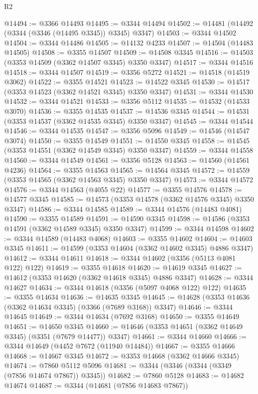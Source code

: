 \begin{lexlean}{R2}
\begin{coremodule}
@14494 := @3366 @14493
@14495 := @3344 @14494
@14502 := @14481 (@14492 (@3344 (@3346 (@14495 @3345)) @3345) @3347)
@14503 := @3344 @14502
@14504 := @3344 @14486
@14505 := @14132 @4233
@14507 := @14504 (@14483 @14505)
@14508 := @3355 @14507
@14509 := @14508 @3345
@14516 := @14503 (@3353 @14509 (@3362 @14507 @3345) @3350 @3347)
@14517 := @3344 @14516
@14518 := @3344 @14507
@14519 := @3356 @5272
@14521 := @14518 (@14519 @3062)
@14522 := @3355 @14521
@14523 := @14522 @3345
@14530 := @14517 (@3353 @14523 (@3362 @14521 @3345) @3350 @3347)
@14531 := @3344 @14530
@14532 := @3344 @14521
@14533 := @3356 @5112
@14535 := @14532 (@14533 @3070)
@14536 := @3355 @14535
@14537 := @14536 @3345
@14544 := @14531 (@3353 @14537 (@3362 @14535 @3345) @3350 @3347)
@14545 := @3344 @14544
@14546 := @3344 @14535
@14547 := @3356 @5096
@14549 := @14546 (@14547 @3074)
@14550 := @3355 @14549
@14551 := @14550 @3345
@14558 := @14545 (@3353 @14551 (@3362 @14549 @3345) @3350 @3347)
@14559 := @3344 @14558
@14560 := @3344 @14549
@14561 := @3356 @5128
@14563 := @14560 (@14561 @4236)
@14564 := @3355 @14563
@14565 := @14564 @3345
@14572 := @14559 (@3353 @14565 (@3362 @14563 @3345) @3350 @3347)
@14573 := @3344 @14572
@14576 := @3344 @14563 (@4055 @22)
@14577 := @3355 @14576
@14578 := @14577 @3345
@14585 := @14573 (@3353 @14578 (@3362 @14576 @3345) @3350 @3347)
@14586 := @3344 @14585
@14589 := @3344 @14576 (@14483 @4081)
@14590 := @3355 @14589
@14591 := @14590 @3345
@14598 := @14586 (@3353 @14591 (@3362 @14589 @3345) @3350 @3347)
@14599 := @3344 @14598
@14602 := @3344 @14589 (@14483 @4068)
@14603 := @3355 @14602
@14604 := @14603 @3345
@14611 := @14599 (@3353 @14604 (@3362 @14602 @3345) @4886 @3347)
@14612 := @3344 @14611
@14618 := @3344 @14602 (@3356 (@5113 @4081 @122) @122)
@14619 := @3355 @14618
@14620 := @14619 @3345
@14627 := @14612 (@3353 @14620 (@3362 @14618 @3345) @4886 @3347)
@14628 := @3344 @14627
@14634 := @3344 @14618 (@3356 (@5097 @4068 @122) @122)
@14635 := @3355 @14634
@14636 := @14635 @3345
@14645 := @14628 (@3353 @14636 (@3362 @14634 @3345) (@3366 (@7689 @3168)) @3347)
@14646 := @3344 @14645
@14649 := @3344 @14634 (@7692 @3168)
@14650 := @3355 @14649
@14651 := @14650 @3345
@14660 := @14646 (@3353 @14651 (@3362 @14649 @3345) (@3351 (@7679 @14477)) @3347)
@14661 := @3344 @14660
@14666 := @3344 @14649 (@4452 @7672 (@11940 @14484))
@14667 := @3355 @14666
@14668 := @14667 @3345
@14672 := @3353 @14668 (@3362 @14666 @3345)
@14674 := @7860 @5112 @5096
@14681 := @3344 (@3346 (@3344 (@3349 (@7856 @14674 @7867)) @3345))
@14682 := @7860 @5128
@14683 := @14682 @14674
@14687 := @3344 (@14681 (@7856 @14683 @7867))

\end{coremodule}
\end{lexlean}
